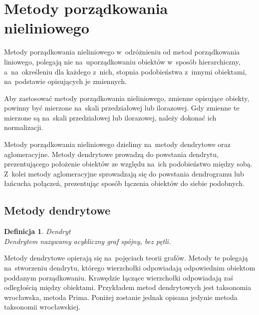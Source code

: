 \documentclass[12pt,a4paper]{report}
\newtheorem{definition}[theorem]{Definicja}
\begin{document}
\section{Metody porządkowania nieliniowego}


Metody porządkowania nieliniowego w~odróżnieniu od metod porządkowania liniowego, polegają nie na~uporządkowaniu obiektów w~sposób hierarchiczny, a~na~określeniu dla każdego z~nich, stopnia podobieństwa z~innymi obiektami, na~podstawie opisujących je zmiennych. 

Aby zastosować metody porządkowania nieliniowego, zmienne opisujące obiekty, powinny być mierzone na~skali przedziałowej lub ilorazowej. Gdy zmienne te mierzone są na~skali przedziałowej lub ilorazowej, należy dokonać ich normalizacji.

Metody porządkowania nieliniowego dzielimy na~metody dendrytowe oraz aglomeracyjne. Metody dendrytowe prowadzą do powstania dendrytu, prezentującego położenie obiektów ze względu na~ich podobieństwo między sobą. Z~kolei metody aglomeracyjne sprowadzają się do powstania dendrogramu lub łańcucha połączeń, prezentując sposób łączenia obiektów do siebie podobnych. 

\subsection{Metody dendrytowe}

\begin{definition}{Dendryt \cite[Rozdział 2.3]{panek2013}}\\
Dendrytem nazywamy acykliczny graf spójny, bez pętli.
\end{definition}

Metody dendrytowe opierają się na~pojęciach teorii grafów. Metody te polegają na~stworzeniu dendrytu, którego wierzchołki odpowiadają odpowiednim obiektom poddanym porządkowaniu. Krawędzie łączące wierzchołki odpowiadają zaś odległością między obiektami. Przykładem metod dendrytowych jest taksonomia wrocławska, metoda Prima.   Poniżej zostanie jednak opisana jedynie metoda taksonomii wrocławskiej.  
\end{document}
